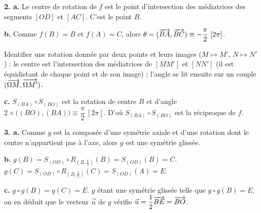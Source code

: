 \documentclass[11pt]{article}
\begin{document}
\begin{center}
\end{center}

\textbf{2. a.} Le centre de rotation de $f$ est le point d'intersection des médiatrices des segments $[OD]$ et $[AC]$. C'est le point $B$.

\textbf{b.} Comme $f(B) = B$ et $f(A) = C$, alors $\theta = (\overrightarrow{BA}, \overrightarrow{BC}) \equiv -\dfrac{\pi}{2}\ [2\pi]$.

\begin{methode}
Identifier une rotation donnée par deux points et leurs images
($M \mapsto M'$, $N \mapsto N'$) : le centre est l'intersection des
médiatrices de $[MM']$ et $[NN']$ (il est équidistant de chaque point
et de son image) ; l'angle se lit ensuite sur un couple
$(\overrightarrow{\Omega M}, \overrightarrow{\Omega M'})$.
\end{methode}

\textbf{c.} $S_{(BA)} \circ S_{(BO)}$ est la rotation de centre $B$ et d'angle $2 \times \big((BO),(BA)\big) \equiv \dfrac{\pi}{2}\ [2\pi]$. D'où $S_{(BA)} \circ S_{(BO)}$ est la réciproque de $f$.

\textbf{3. a.} Comme $g$ est la composée d'une symétrie axiale et d'une rotation dont le centre n'appartient pas à l'axe, alors $g$ est une symétrie glissée.

\textbf{b.} $g(B) = S_{(OD)} \circ R_{(B,\frac{\pi}{2})}(B) = S_{(OD)}(B) = C$. $g(C) = S_{(OD)} \circ R_{(B,\frac{\pi}{2})}(C) = S_{(OD)}(A) = E$.

\textbf{c.} $g \circ g(B) = g(C) = E$. $g$ étant une symétrie glissée telle que $g \circ g(B) = E$, on en déduit que le vecteur $\vec{u}$ de $g$ vérifie $\vec{u} = \dfrac{1}{2}\overrightarrow{BE} = \overrightarrow{BO}$.
\end{document}
